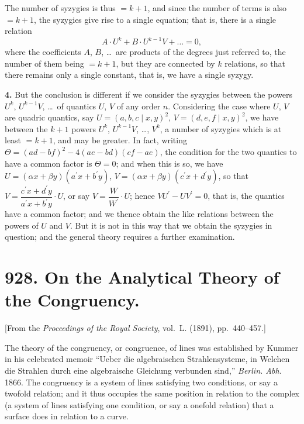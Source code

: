 \documentclass[12pt,a4paper]{article}
\begin{document}
The number of syzygies is thus $= k + 1$, and since the number of terms is
also $= k + 1$, the syzygies give rise to a single equation; that is, there is a single
relation
\[
A \cdot U^k + B \cdot U^{k-1}V + \ldots = 0,
\]
where the coefficients $A$, $B$, \ldots\ are products of the degrees just referred to, the
number of them being $= k + 1$, but they are connected by $k$ relations, so that there
remains only a single constant, that is, we have a single syzygy.

\textbf{4.} But the conclusion is different if we consider the syzygies between the
powers $U^k$, $U^{k-1}V$, \ldots\ of quantics $U$, $V$ of any order $n$. Considering the case
where $U$, $V$ are quadric quantics, say $U = (a, b, c \mid x, y)^2$, $V = (d, e, f \mid x, y)^2$,
we have between the $k + 1$ powers $U^k$, $U^{k-1}V$, \ldots, $V^k$, a number of syzygies which
is at least $= k + 1$, and may be greater. In fact, writing $\Theta = (ad - bf)^2 - 4(ae - bd)(cf - ae)$,
the condition for the two quantics to have a common factor is $\Theta = 0$; and when
this is so, we have $U = (\alpha x + \beta y)(a^\prime x + b^\prime y)$, $V = (\alpha x + \beta y)(c^\prime x + d^\prime y)$,
so that $V = \dfrac{c^\prime x + d^\prime y}{a^\prime x + b^\prime y} \cdot U$, or say $V = \dfrac{W}{W^\prime} \cdot U$; hence $VU^\prime - UV^\prime = 0$,
that is, the quantics have a common factor; and we thence obtain the like relations
between the powers of $U$ and $V$. But it is not in this way that we obtain the
syzygies in question; and the general theory requires a further examination.



\newpage
\section*{928. On the Analytical Theory of the Congruency.}

[From the \textit{Proceedings of the Royal Society}, vol.~L. (1891), pp.~440--457.]

\bigskip

The theory of the congruency, or congruence, of lines was established by
Kummer in his celebrated memoir ``Ueber die algebraischen Strahlensysteme, in
Welchen die Strahlen durch eine algebraische Gleichung verbunden sind,'' \textit{Berlin.
Abh.} 1866. The congruency is a system of lines satisfying two conditions, or say
a twofold relation; and it thus occupies the same position in relation to the complex
(a system of lines satisfying one condition, or say a onefold relation) that a surface
does in relation to a curve.
\end{document}
